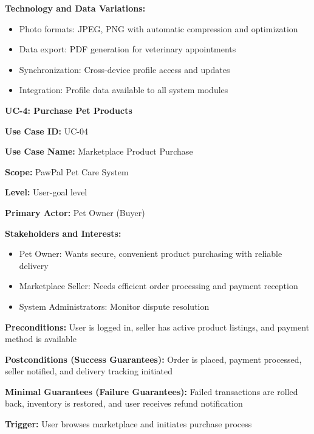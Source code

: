 \textbf{Technology and Data Variations:}
\begin{itemize}
    \item Photo formats: JPEG, PNG with automatic compression and optimization
    \item Data export: PDF generation for veterinary appointments
    \item Synchronization: Cross-device profile access and updates
    \item Integration: Profile data available to all system modules
\end{itemize}

\textbf{UC-4: Purchase Pet Products}

\textbf{Use Case ID:} UC-04

\textbf{Use Case Name:} Marketplace Product Purchase

\textbf{Scope:} PawPal Pet Care System

\textbf{Level:} User-goal level

\textbf{Primary Actor:} Pet Owner (Buyer)

\textbf{Stakeholders and Interests:}
\begin{itemize}
    \item Pet Owner: Wants secure, convenient product purchasing with reliable delivery
    \item Marketplace Seller: Needs efficient order processing and payment reception
    \item System Administrators: Monitor dispute resolution
\end{itemize}

\textbf{Preconditions:} User is logged in, seller has active product listings, and payment method is available

\textbf{Postconditions (Success Guarantees):} Order is placed, payment processed, seller notified, and delivery tracking initiated

\textbf{Minimal Guarantees (Failure Guarantees):} Failed transactions are rolled back, inventory is restored, and user receives refund notification

\textbf{Trigger:} User browses marketplace and initiates purchase process

